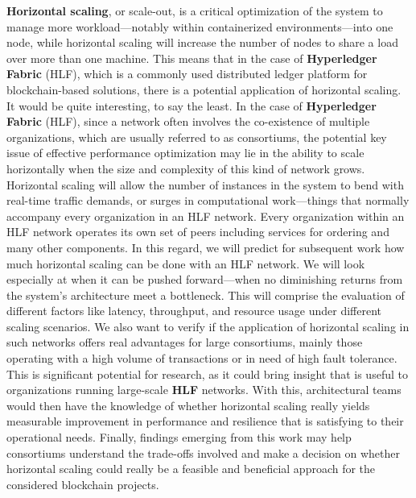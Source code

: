 \textbf{Horizontal scaling}, or scale-out, is a critical optimization of the system to manage more workload—notably within containerized environments—into one node, while horizontal scaling will increase the number of nodes to share a load over more than one machine.
This means that in the case of \textbf{Hyperledger Fabric} (HLF), which is a commonly used distributed ledger platform for blockchain-based solutions, there is a potential application of horizontal scaling. It would be quite interesting, to say the least. In the case of \textbf{Hyperledger Fabric} (HLF), since a network often involves the co-existence of multiple organizations, which are usually referred to as consortiums, the potential key issue of effective performance optimization may lie in the ability to scale horizontally when the size and complexity of this kind of network grows. Horizontal scaling will allow the number of instances in the system to bend with real-time traffic demands, or surges in computational work—things that normally accompany every organization in an HLF network. Every organization within an HLF network operates its own set of peers including services for ordering and many other components.
In this regard, we will predict for subsequent work how much horizontal scaling can be done with an HLF network. We will look especially at when it can be pushed forward—when no diminishing returns from the system's architecture meet a bottleneck. This will comprise the evaluation of different factors like latency, throughput, and resource usage under different scaling scenarios. We also want to verify if the application of horizontal scaling in such networks offers real advantages for large consortiums, mainly those operating with a high volume of transactions or in need of high fault tolerance.
This is significant potential for research, as it could bring insight that is useful to organizations running large-scale \textbf{HLF} networks. With this, architectural teams would then have the knowledge of whether horizontal scaling really yields measurable improvement in performance and resilience that is satisfying to their operational needs. Finally, findings emerging from this work may help consortiums understand the trade-offs involved and make a decision on whether horizontal scaling could really be a feasible and beneficial approach for the considered blockchain projects.


